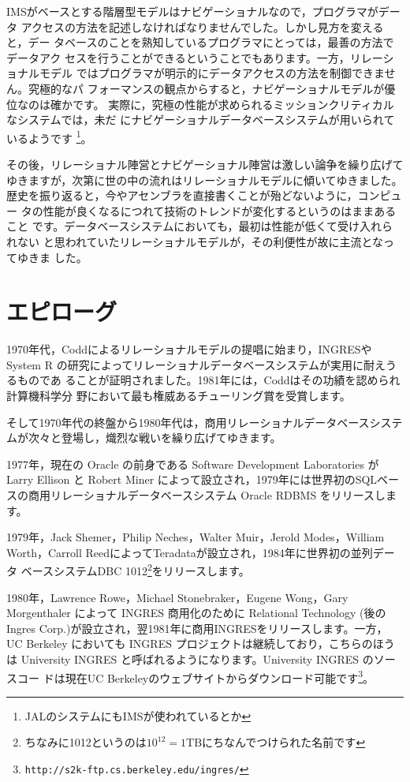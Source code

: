 IMSがベースとする階層型モデルはナビゲーショナルなので，プログラマがデータ
アクセスの方法を記述しなければなりませんでした。しかし見方を変えると，デー
タベースのことを熟知しているプログラマにとっては，最善の方法でデータアク
セスを行うことができるということでもあります。一方，リレーショナルモデル
ではプログラマが明示的にデータアクセスの方法を制御できません。究極的なパ
フォーマンスの観点からすると，ナビゲーショナルモデルが優位なのは確かです。
実際に，究極の性能が求められるミッションクリティカルなシステムでは，未だ
にナビゲーショナルデータベースシステムが用いられているようです
\footnote{JALのシステムにもIMSが使われているとか}。


その後，リレーショナル陣営とナビゲーショナル陣営は激しい論争を繰り広げて
ゆきますが，次第に世の中の流れはリレーショナルモデルに傾いてゆきました。
歴史を振り返ると，今やアセンブラを直接書くことが殆どないように，コンピュー
タの性能が良くなるにつれて技術のトレンドが変化するというのはままあること
です。データベースシステムにおいても，最初は性能が低くて受け入れられない
と思われていたリレーショナルモデルが，その利便性が故に主流となってゆきま
した。


\section{エピローグ}


1970年代，Coddによるリレーショナルモデルの提唱に始まり，INGRESやSystem R
の研究によってリレーショナルデータベースシステムが実用に耐えうるものであ
ることが証明されました。1981年には，Coddはその功績を認められ計算機科学分
野において最も権威あるチューリング賞を受賞します。


そして1970年代の終盤から1980年代は，商用リレーショナルデータベースシステ
ムが次々と登場し，熾烈な戦いを繰り広げてゆきます。


1977年，現在の Oracle の前身である Software Development Laboratories が
Larry Ellison と Robert Miner によって設立され，1979年には世界初のSQLベー
スの商用リレーショナルデータベースシステム Oracle RDBMS をリリースします。


1979年，Jack Shemer，Philip Neches，Walter Muir，Jerold Modes，William
Worth，Carroll ReedによってTeradataが設立され，1984年に世界初の並列データ
ベースシステムDBC 1012\footnote{ちなみに1012というのは$10^{12} = 1 \mathrm{TB}$にちなんでつけられた名前です}をリリースします。


1980年，Lawrence Rowe，Michael Stonebraker，Eugene Wong，Gary
Morgenthaler によって INGRES 商用化のために Relational Technology (後の
Ingres Corp.)が設立され，翌1981年に商用INGRESをリリースします。一方，UC
Berkeley においても INGRES プロジェクトは継続しており，こちらのほうは
University INGRES と呼ばれるようになります。University INGRES のソースコー
ドは現在UC Berkeleyのウェブサイトからダウンロード可能です\footnote{\verb|http://s2k-ftp.cs.berkeley.edu/ingres/|}。


